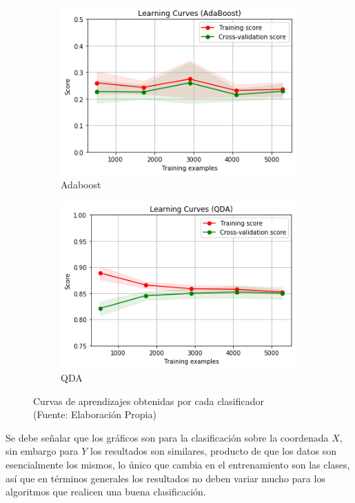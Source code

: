 \begin{figure}[ht!]
\begin{subfigure}{.5\textwidth}
  \centering
  \includegraphics[width=.8\linewidth]{figures/adaboost.png}
  \caption{Adaboost}
  \label{fig:sub1}
\end{subfigure}%
\begin{subfigure}{.5\textwidth}
  \centering
  \includegraphics[width=.8\linewidth]{figures/qda.png}
  \caption{QDA}
  \label{fig:sub2}
\end{subfigure}
\caption[Curvas de aprendizajes obtenidas por cada clasificador]{Curvas de aprendizajes obtenidas por cada clasificador \\
{\scriptsize (Fuente: Elaboración Propia)}}
\label{fig:comparativa_clasificadores}
\end{figure}

Se debe señalar que los gráficos son para la clasificación sobre la coordenada $X$, sin embargo para $Y$ los resultados son similares, producto de que los datos son esencialmente los mismos, lo único que cambia en el entrenamiento son las clases, así que en términos generales los resultados no deben variar mucho para los algoritmos que realicen una buena clasificación.


